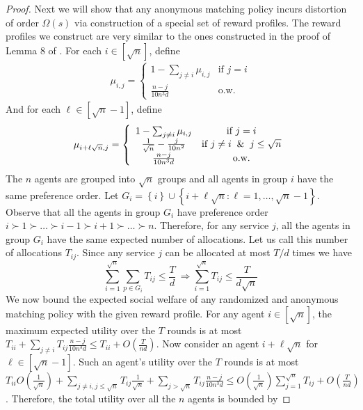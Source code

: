 \documentclass[letterpaper,11pt]{article}
\newcommand{\set}[1]{\left\{ #1 \right\}}
\begin{document}
\begin{proof}
    Next we will show that any anonymous matching policy incurs distortion of order $\Omega(s)$ via construction of a special set of reward profiles. The reward profiles we construct are very similar to the ones constructed in the proof of Lemma 8 of \cite{FFKZ14}. For each $i \in [\sqrt{n}]$, define 
    \begin{align*}
        \mu_{i, j} = \left\{\begin{array}{cc}
            1 - \sum_{j \neq i} \mu_{i, j} & \textrm{if } j = i\\
            \frac{n-j}{10 n^3 d} & \textrm{o.w.}
        \end{array} \right.
    \end{align*}
    And for each $\ell \in [\sqrt{n}-1]$, define
    \begin{align*}
        \mu_{i+\ell\sqrt{n}, j} = \left\{\begin{array}{cc}
             1 - \sum_{j \neq i} \mu_{i, j} & \textrm{if } j = i\\
             \frac{1}{\sqrt{n}} - \frac{j}{10n^2} & \textrm{if } j \neq i \And j \le \sqrt{n}\\
             \frac{n-j}{10 n^3 d} & \textrm{o.w.}
        \end{array}
        \right.
    \end{align*}
     The $n$ agents are grouped into $\sqrt{n}$ groups and all agents in group $i$ have the same preference order. Let $G_i = \set{i} \cup \set{i + \ell \sqrt{n}: \ell=1,\ldots,\sqrt{n}-1}$. Observe that all the agents in group $G_i$ have preference order $i \succ 1 \succ \ldots \succ i-1\succ i+1 \succ \ldots \succ n$. Therefore, for any service $j$, all the agents in group $G_i$ have  the same expected number of allocations. Let us call this number of allocations $T_{ij}$. Since any service $j$ can be allocated at most $T/d$ times we have
     \begin{equation}\label{eq:bound-sum-Tij}
     \sum_{i=1}^{\sqrt{n}} \sum_{p \in G_i} T_{ij} \le \frac{T}{d} \ \Rightarrow \sum_{i=1}^{\sqrt{n}} T_{ij} \le \frac{T}{d\sqrt{n}}
     \end{equation}
We now bound the expected social welfare of any randomized and anonymous matching policy with the given reward profile. For any agent $i \in [\sqrt{n}]$, the maximum expected utility over the $T$ rounds is at most $T_{ii} + \sum_{j \neq i} T_{ij} \frac{n-j}{10 n^3 d} \le T_{ii} + O\left( \frac{T}{nd}\right)$. Now consider an agent $i + \ell \sqrt{n}$ for $\ell \in [\sqrt{n}-1]$. Such an agent's utility over the $T$ rounds is at most $T_{ii}O\left(\frac{1}{\sqrt{n}} \right) + \sum_{j \neq i, j \le \sqrt{n}} T_{ij} \frac{1}{\sqrt{n}} + \sum_{j > \sqrt{n}} T_{ij} \frac{n-j}{10n^3 d} \le O\left(\frac{1}{\sqrt{n}} \right) \sum_{j=1}^{\sqrt{n}} T_{ij} + O\left(\frac{T}{nd} \right)$. Therefore, the total utility over all the $n$ agents is bounded by

\end{proof}
\end{document}
